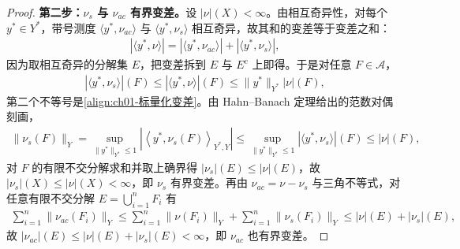 \documentclass[../../main.tex]{subfiles}%
\begin{document}
\begin{proof}
\textbf{第二步：$\nu_s$ 与 $\nu_{ac}$ 有界变差。}设 $|\nu|(X)<\infty$。由相互奇异性，对每个 $y^*\in Y^*$，带号测度 $\langle y^*,\nu_{ac}\rangle$ 与 $\langle y^*,\nu_s\rangle$ 相互奇异，故其和的变差等于变差之和：
\begin{align}
\left|\langle y^*,\nu\rangle\right|=\left|\langle y^*,\nu_{ac}\rangle\right|+\left|\langle y^*,\nu_s\rangle\right|, \label{align:ch01-向量Lebesgue分解唯一2}
\end{align}
因为取相互奇异的分解集 $E$，把变差拆到 $E$ 与 $E^c$ 上即得。于是对任意 $F\in\mathcal{A}$，
\begin{align}
\left|\langle y^*,\nu_s\rangle\right|(F)\leqslant\left|\langle y^*,\nu\rangle\right|(F)\leqslant\|y^*\|_{Y^*}|\nu|(F), \label{align:ch01-向量Lebesgue分解唯一3}
\end{align}
第二个不等号是\eqref{align:ch01-标量化变差}。由 Hahn--Banach 定理给出的范数对偶刻画，
\begin{align*}
\|\nu_s(F)\|_Y=\sup_{\|y^*\|_{Y^*}\leqslant1}\left|\left\langle y^*,\nu_s(F)\right\rangle_{Y^*,Y}\right|
\leqslant\sup_{\|y^*\|_{Y^*}\leqslant1}\left|\langle y^*,\nu_s\rangle\right|(F)\leqslant|\nu|(F),
\end{align*}
对 $F$ 的有限不交分解求和并取上确界得 $|\nu_s|(E)\leqslant|\nu|(E)$，故 $|\nu_s|(X)\leqslant|\nu|(X)<\infty$，即 $\nu_s$ 有界变差。再由 $\nu_{ac}=\nu-\nu_s$ 与三角不等式，对任意有限不交分解 $E=\bigcup_{i=1}^nF_i$ 有
\begin{align*}
\sum_{i=1}^n\|\nu_{ac}(F_i)\|_Y\leqslant\sum_{i=1}^n\|\nu(F_i)\|_Y+\sum_{i=1}^n\|\nu_s(F_i)\|_Y\leqslant|\nu|(E)+|\nu_s|(E),
\end{align*}
故 $|\nu_{ac}|(E)\leqslant|\nu|(E)+|\nu_s|(E)<\infty$，即 $\nu_{ac}$ 也有界变差。


\end{proof}
\end{document}
